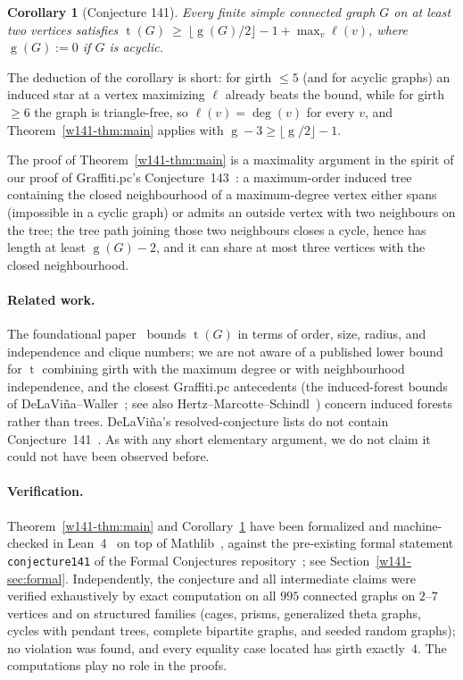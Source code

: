 \documentclass[11pt]{article}
\numberwithin{equation}{section}
\newtheorem{corollary}[theorem]{Corollary}
\theoremstyle{remark}
\newcommand{\tr}{\operatorname{t}}
\newcommand{\gr}{\operatorname{g}}
\newcommand{\lv}{\ell}
\begin{document}
\begin{corollary}[Conjecture 141]\label{w141-cor:141}
Every finite simple connected graph $G$ on at least two vertices satisfies
$\tr(G)\ \ge\ \lfloor \gr(G)/2\rfloor - 1 + \max_v \lv(v)$, where
$\gr(G):=0$ if $G$ is acyclic.
\end{corollary}

The deduction of the corollary is short: for girth $\le5$ (and for acyclic
graphs) an induced star at a vertex maximizing $\lv$ already beats the bound,
while for girth $\ge6$ the graph is triangle-free, so $\lv(v)=\deg(v)$ for
every $v$, and Theorem~\ref{w141-thm:main} applies with
$\gr-3\ge\lfloor\gr/2\rfloor-1$.

The proof of Theorem~\ref{w141-thm:main} is a maximality argument in the spirit of
our proof of Graffiti.pc's Conjecture~143~\cite{FC4454}: a maximum-order induced
tree containing the closed neighbourhood of a maximum-degree vertex either
spans (impossible in a cyclic graph) or admits an outside vertex with two
neighbours on the tree; the tree path joining those two neighbours closes a
cycle, hence has length at least $\gr(G)-2$, and it can share at most three
vertices with the closed neighbourhood.

\paragraph{Related work.}
The foundational paper~\cite{ESS86} bounds $\tr(G)$ in terms of order, size,
radius, and independence and clique numbers; we are not aware of a published
lower bound for $\tr$ combining girth with the maximum degree or with
neighbourhood independence, and the closest Graffiti.pc antecedents (the
induced-forest bounds of DeLaVi\~na--Waller~\cite{DW04}; see also
Hertz--Marcotte--Schindl~\cite{HMS14}) concern induced forests rather than
trees.  DeLaVi\~na's resolved-conjecture lists do not contain
Conjecture~141~\cite{WOWII}.  As with any short elementary argument, we do
not claim it could not have been observed before.

\paragraph{Verification.}
Theorem~\ref{w141-thm:main} and Corollary~\ref{w141-cor:141} have been formalized and
machine-checked in Lean~4~\cite{Lean4} on top of Mathlib~\cite{mathlib},
against the pre-existing formal statement \texttt{conjecture141} of the
Formal Conjectures repository~\cite{FC141}; see Section~\ref{w141-sec:formal}.
Independently, the conjecture and all intermediate claims were verified
exhaustively by exact computation on all $995$ connected graphs on $2$--$7$
vertices and on structured families (cages, prisms, generalized theta graphs,
cycles with pendant trees, complete bipartite graphs, and seeded random
graphs); no violation was found, and every equality case located has girth
exactly~$4$.  The computations play no role in the proofs.
\end{document}
